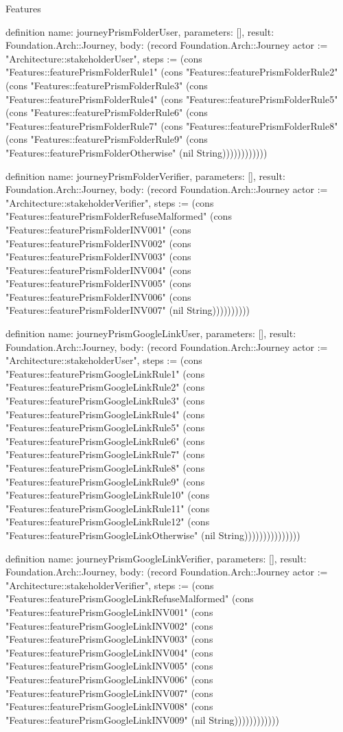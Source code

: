 \begin{lexlean}{Features}
\begin{semanticmodule}
definition{
  name: journeyPrismFolderUser,
  parameters: [],
  result: Foundation.Arch::Journey,
  body: (record Foundation.Arch::Journey {actor := "Architecture::stakeholderUser", steps := (cons "Features::featurePrismFolderRule1" (cons "Features::featurePrismFolderRule2" (cons "Features::featurePrismFolderRule3" (cons "Features::featurePrismFolderRule4" (cons "Features::featurePrismFolderRule5" (cons "Features::featurePrismFolderRule6" (cons "Features::featurePrismFolderRule7" (cons "Features::featurePrismFolderRule8" (cons "Features::featurePrismFolderRule9" (cons "Features::featurePrismFolderOtherwise" (nil String)))))))))))})
}

definition{
  name: journeyPrismFolderVerifier,
  parameters: [],
  result: Foundation.Arch::Journey,
  body: (record Foundation.Arch::Journey {actor := "Architecture::stakeholderVerifier", steps := (cons "Features::featurePrismFolderRefuseMalformed" (cons "Features::featurePrismFolderINV001" (cons "Features::featurePrismFolderINV002" (cons "Features::featurePrismFolderINV003" (cons "Features::featurePrismFolderINV004" (cons "Features::featurePrismFolderINV005" (cons "Features::featurePrismFolderINV006" (cons "Features::featurePrismFolderINV007" (nil String)))))))))})
}

definition{
  name: journeyPrismGoogleLinkUser,
  parameters: [],
  result: Foundation.Arch::Journey,
  body: (record Foundation.Arch::Journey {actor := "Architecture::stakeholderUser", steps := (cons "Features::featurePrismGoogleLinkRule1" (cons "Features::featurePrismGoogleLinkRule2" (cons "Features::featurePrismGoogleLinkRule3" (cons "Features::featurePrismGoogleLinkRule4" (cons "Features::featurePrismGoogleLinkRule5" (cons "Features::featurePrismGoogleLinkRule6" (cons "Features::featurePrismGoogleLinkRule7" (cons "Features::featurePrismGoogleLinkRule8" (cons "Features::featurePrismGoogleLinkRule9" (cons "Features::featurePrismGoogleLinkRule10" (cons "Features::featurePrismGoogleLinkRule11" (cons "Features::featurePrismGoogleLinkRule12" (cons "Features::featurePrismGoogleLinkOtherwise" (nil String))))))))))))))})
}

definition{
  name: journeyPrismGoogleLinkVerifier,
  parameters: [],
  result: Foundation.Arch::Journey,
  body: (record Foundation.Arch::Journey {actor := "Architecture::stakeholderVerifier", steps := (cons "Features::featurePrismGoogleLinkRefuseMalformed" (cons "Features::featurePrismGoogleLinkINV001" (cons "Features::featurePrismGoogleLinkINV002" (cons "Features::featurePrismGoogleLinkINV003" (cons "Features::featurePrismGoogleLinkINV004" (cons "Features::featurePrismGoogleLinkINV005" (cons "Features::featurePrismGoogleLinkINV006" (cons "Features::featurePrismGoogleLinkINV007" (cons "Features::featurePrismGoogleLinkINV008" (cons "Features::featurePrismGoogleLinkINV009" (nil String)))))))))))})
}


\end{semanticmodule}
\end{lexlean}
